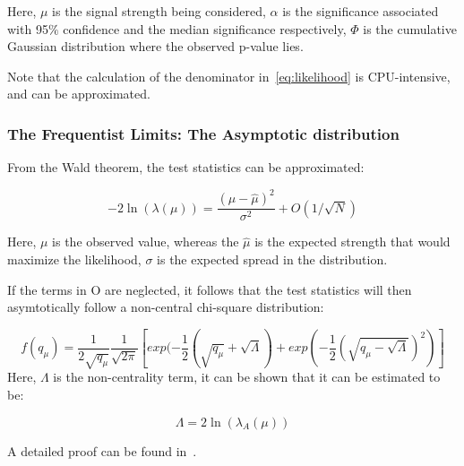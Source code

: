 Here, $\mu$ is the signal strength being considered, $\alpha$ is the significance associated with 95$\%$ confidence and the median significance respectively, $\Phi$ is the cumulative Gaussian distribution where the observed p-value lies.

Note that the calculation of the denominator in~\ref{eq:likelihood} is CPU-intensive, and can be approximated.


\subsubsection{The Frequentist Limits: The Asymptotic distribution}
\label{sec:asymp}


From the Wald theorem, the test statistics can be approximated: 

\begin{equation}
-2\ln(\lambda(\mu))= \frac{(\mu- \hat{\mu})^{2}}{\sigma^{2}} +O(1/\sqrt{N})
\label{eq:wald}
\end{equation}

Here, $\mu$ is the observed value, whereas the $\hat{\mu}$ is the expected strength that would maximize the likelihood, $\sigma$ is the expected spread in the distribution. 

If the terms in O are neglected, it follows that the test statistics will then asymtotically follow a non-central chi-square distribution: 

\begin{equation}
    f(q_{\mu}) = \frac{1}{2\sqrt{q_{\mu}}} \frac{1}{\sqrt{2\pi}} [exp(-\frac{1}{2}(\sqrt{q_{\mu}}+ \sqrt{\Lambda})+ exp(-\frac{1}{2}(\sqrt{q_{\mu}-\sqrt{\Lambda}})^{2})]
\end{equation}
Here, $\Lambda$ is the non-centrality term, it can be shown that it can be estimated to be:

\begin{equation}
    \Lambda=2\ln(\lambda_{A}(\mu))
    \label{eq:Lambda}
\end{equation}

A detailed proof can be found in~\cite{2011}. 







